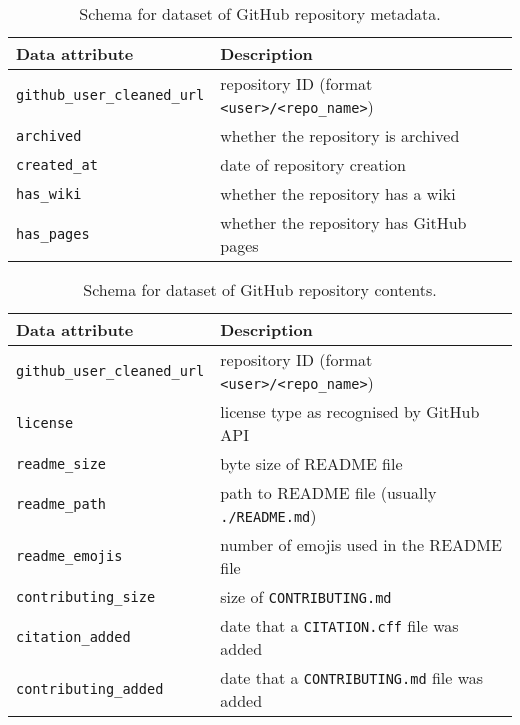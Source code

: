 \documentclass[10pt,a4paper]{scrartcl}
\begin{document}

\begin{table}
    \centering
    \begin{tabular}{l|l}
        \hline
        Data attribute & Description \\
        \hline
        \verb|github_user_cleaned_url| & repository ID (format \verb|<user>/<repo_name>|) \\
        \verb|archived| & whether the repository is archived \\
        \verb|created_at| & date of repository creation \\
        \verb|has_wiki| & whether the repository has a wiki \\
        \verb|has_pages| & whether the repository has GitHub pages \\
        \hline
    \end{tabular}
    \caption{Schema for dataset of GitHub repository metadata.}
    \label{table:metadata}
\end{table}

\begin{table}
    \centering
    \begin{tabular}{l|l}
        \hline
        Data attribute & Description \\
        \hline
        \verb|github_user_cleaned_url| & repository ID (format \verb|<user>/<repo_name>|) \\
        \verb|license| & license type as recognised by GitHub API \\
        \verb|readme_size| & byte size of README file \\
        \verb|readme_path| & path to README file (usually \verb|./README.md|) \\
        \verb|readme_emojis| & number of emojis used in the README file \\
        \verb|contributing_size| & size of \verb|CONTRIBUTING.md| \\
        \verb|citation_added| & date that a \verb|CITATION.cff| file was added \\
        \verb|contributing_added| & date that a \verb|CONTRIBUTING.md| file was added \\
        \hline
    \end{tabular}
    \caption{Schema for dataset of GitHub repository contents.}
    \label{table:contents}
\end{table}
\end{document}
